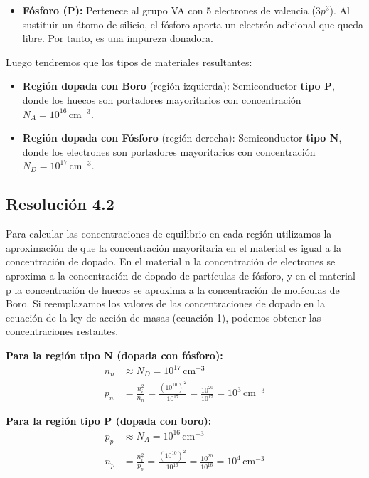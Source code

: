 \documentclass[
  11pt,
  letterpaper,
   addpoints,
  ]{exam}
\begin{document}
\begin{questions}
\begin{solution}
\begin{itemize}
        \item \textbf{Fósforo (P):} Pertenece al grupo VA con 5 electrones de valencia ($3p^3$). Al sustituir un átomo de silicio, el fósforo aporta un electrón adicional que queda libre. Por tanto, es una impureza donadora.
    \end{itemize}
Luego tendremos que los tipos de materiales resultantes:
    \begin{itemize}
        \item \textbf{Región dopada con Boro} (región izquierda): Semiconductor \textbf{tipo P}, donde los huecos son portadores mayoritarios con concentración $N_A = 10^{16}\,\mathrm{cm^{-3}}$.
        
        \item \textbf{Región dopada con Fósforo} (región derecha): Semiconductor \textbf{tipo N}, donde los electrones son portadores mayoritarios con concentración $N_D = 10^{17}\,\mathrm{cm^{-3}}$.
    \end{itemize}
    \subsection*{Resolución 4.2}
    
    Para calcular las concentraciones de equilibrio en cada región utilizamos la aproximación de que la concentración mayoritaria en el material es igual a la concentración de dopado. En el material n la concentración de electrones se aproxima a la concentración de dopado de partículas de fósforo, y en el material p la concentración de huecos se aproxima a la concentración de moléculas de Boro. Si reemplazamos los valores de las concentraciones de dopado en la ecuación de la ley de acción de masas (ecuación 1), podemos obtener las concentraciones restantes.

    \textbf{Para la región tipo N (dopada con fósforo):}
    \begin{align}
        n_n &\approx N_D = 10^{17}\,\text{cm}^{-3} \\
        p_n &= \frac{n_i^2}{n_n} = \frac{(10^{10})^2}{10^{17}} = \frac{10^{20}}{10^{17}} = 10^3\,\text{cm}^{-3}
    \end{align}

    \textbf{Para la región tipo P (dopada con boro):}
    \begin{align}
        p_p &\approx N_A = 10^{16}\,\text{cm}^{-3} \\
        n_p &= \frac{n_i^2}{p_p} = \frac{(10^{10})^2}{10^{16}} = \frac{10^{20}}{10^{16}} = 10^4\,\text{cm}^{-3}
    \end{align}


\end{solution}
\end{questions}
\end{document}
